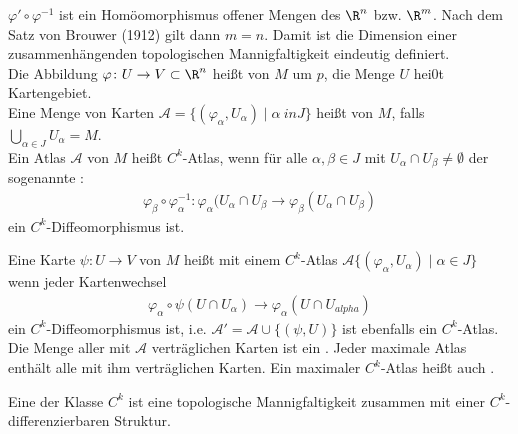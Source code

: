 \begin{dfn*}
  $\varphi' \circ \varphi^{-1}$ ist ein Homöomorphismus offener Mengen des $\R^n$ bzw. $\R^m$. Nach dem Satz von Brouwer (1912) gilt dann $m = n$. Damit ist die Dimension einer zusammenhängenden topologischen Mannigfaltigkeit eindeutig definiert.\\

  Die Abbildung $\varphi \colon U \to V \subset \R^n$ heißt  von $M$ um $p$, die Menge $U$ hei0t Kartengebiet.\\

  Eine Menge von Karten $\mathcal A = \{(\varphi_{\alpha}, U_{\alpha}) \mid \alpha \ in J \}$ heißt  von $M$, falls $\bigcup_{\alpha \in J}U_{\alpha} = M$.\\

  Ein Atlas $\mathcal A$ von $M$ heißt $C^k$-Atlas, wenn für alle $\alpha, \beta \in J$ mit $U_{\alpha} \cap U_{\beta} \neq \emptyset$ der sogenannte :
  \begin{align*}
    \varphi_{\beta} \circ \varphi_{\alpha}^{-1}\colon \varphi_{\alpha}(U_{\alpha} \cap U_{\beta} \to \varphi_{\beta}(U_{\alpha} \cap U_{\beta})
  \end{align*}
  ein $C^k$-Diffeomorphismus ist.\\



  Eine Karte $\psi \colon U \to V$ von $M$ heißt  mit einem $C^k$-Atlas $\mathcal A  \{(\varphi_{\alpha},U_{\alpha}) \mid \alpha \in J\}$ wenn jeder Kartenwechsel
  \begin{align*}
    \varphi_{\alpha} \circ \psi(U \cap U_{\alpha}) \to \varphi_{\alpha}(U \cap U_{alpha})
  \end{align*}
  ein $C^k$-Diffeomorphismus ist, i.e. $\mathcal A' = \mathcal A \cup \{(\psi, U)\}$ ist ebenfalls ein $C^k$-Atlas.\\

  Die Menge aller mit $\mathcal A$ verträglichen Karten ist ein . Jeder maximale Atlas enthält alle mit ihm verträglichen Karten. Ein maximaler $C^k$-Atlas heißt auch .

\end{dfn*}

\begin{dfn}
  Eine  der Klasse $C^k$ ist eine topologische Mannigfaltigkeit zusammen mit einer $C^{k}$-differenzierbaren Struktur.\\
\end{dfn}

